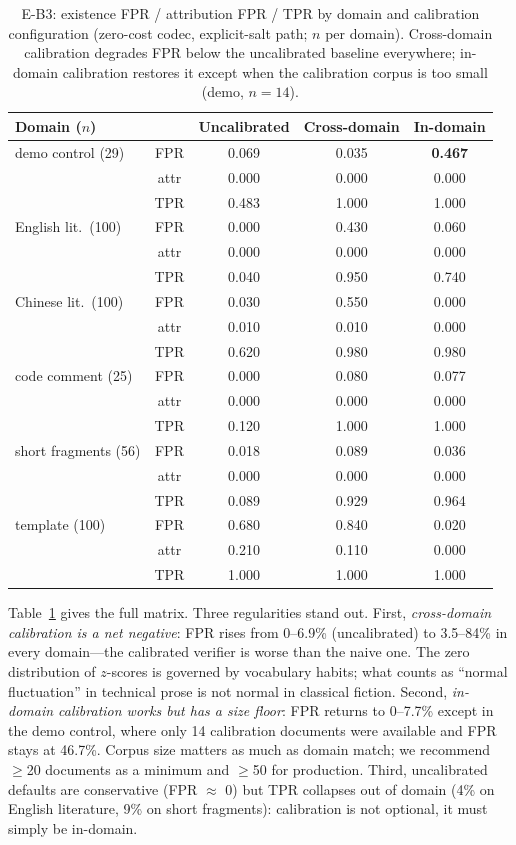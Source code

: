 \begin{table}[t]
\centering\small
\caption{E-B3: existence FPR / attribution FPR / TPR by domain and
calibration configuration (zero-cost codec, explicit-salt path; $n$ per
domain). Cross-domain calibration degrades FPR below the uncalibrated
baseline everywhere; in-domain calibration restores it except when the
calibration corpus is too small (demo, $n{=}14$).}
\label{tab:eb3}
\begin{tabular}{@{}l@{\hspace{4pt}}c@{\hspace{4pt}}ccc@{}}
\toprule
Domain ($n$) &  & Uncalibrated & Cross-domain & In-domain \\
\midrule
demo control (29) & FPR & 0.069 & 0.035 & \textbf{0.467} \\
& attr & 0.000 & 0.000 & 0.000 \\
& TPR & 0.483 & 1.000 & 1.000 \\
\midrule
English lit.\ (100) & FPR & 0.000 & 0.430 & 0.060 \\
& attr & 0.000 & 0.000 & 0.000 \\
& TPR & 0.040 & 0.950 & 0.740 \\
\midrule
Chinese lit.\ (100) & FPR & 0.030 & 0.550 & 0.000 \\
& attr & 0.010 & 0.010 & 0.000 \\
& TPR & 0.620 & 0.980 & 0.980 \\
\midrule
code comment (25) & FPR & 0.000 & 0.080 & 0.077 \\
& attr & 0.000 & 0.000 & 0.000 \\
& TPR & 0.120 & 1.000 & 1.000 \\
\midrule
short fragments (56) & FPR & 0.018 & 0.089 & 0.036 \\
& attr & 0.000 & 0.000 & 0.000 \\
& TPR & 0.089 & 0.929 & 0.964 \\
\midrule
template (100) & FPR & 0.680 & 0.840 & 0.020 \\
& attr & 0.210 & 0.110 & 0.000 \\
& TPR & 1.000 & 1.000 & 1.000 \\
\bottomrule
\end{tabular}
\end{table}

Table~\ref{tab:eb3} gives the full matrix. Three regularities stand out.
First, \emph{cross-domain calibration is a net negative}: FPR rises from
0--6.9\% (uncalibrated) to 3.5--84\% in every domain---the calibrated
verifier is worse than the naive one. The zero distribution of $z$-scores is
governed by vocabulary habits; what counts as ``normal fluctuation'' in
technical prose is not normal in classical fiction. Second, \emph{in-domain
calibration works but has a size floor}: FPR returns to 0--7.7\% except in
the demo control, where only 14 calibration documents were available and
FPR stays at 46.7\%. Corpus size matters as much as domain match; we
recommend $\ge$20 documents as a minimum and $\ge$50 for production.
Third, uncalibrated defaults are conservative (FPR $\approx$ 0) but TPR
collapses out of domain (4\% on English literature, 9\% on short
fragments): calibration is not optional, it must simply be in-domain.

